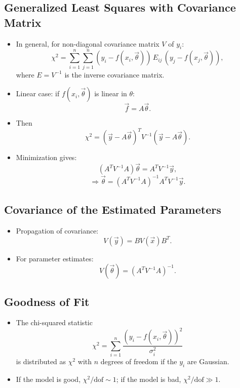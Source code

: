 \subsection{Generalized Least Squares with Covariance Matrix}
\begin{itemize}
    \item In general, for non-diagonal covariance matrix $V$ of $y_i$:
          \[
              \chi^2 = \sum_{i=1}^{n} \sum_{j=1}^{n}
              (y_i - f(x_i, \vec{\theta})) \, E_{ij} \, (y_j - f(x_j, \vec{\theta})),
          \]
          where $E = V^{-1}$ is the inverse covariance matrix.
    \item Linear case: if $f(x_i, \vec{\theta})$ is linear in $\theta$:
          \[
              \vec{f} = A \vec{\theta}.
          \]
    \item Then
          \[
              \chi^2 = (\vec{y} - A \vec{\theta})^T V^{-1} (\vec{y} - A \vec{\theta}).
          \]
    \item Minimization gives:
          \[
              (A^T V^{-1} A) \vec{\theta} = A^T V^{-1} \vec{y},
          \]
          \[
              \Rightarrow \vec{\theta} = (A^T V^{-1} A)^{-1} A^T V^{-1} \vec{y}.
          \]
\end{itemize}

\subsection{Covariance of the Estimated Parameters}
\begin{itemize}
    \item Propagation of covariance:
          \[
              V(\vec{y}) = B V(\vec{x}) B^T.
          \]
    \item For parameter estimates:
          \[
              V(\vec{\theta}) = (A^T V^{-1} A)^{-1}.
          \]
\end{itemize}

\subsection{Goodness of Fit}
\begin{itemize}
    \item The chi-squared statistic
          \[
              \chi^2 = \sum_{i=1}^{n} \frac{(y_i - f(x_i, \vec{\theta}))^2}{\sigma_i^2}
          \]
          is distributed as $\chi^2$ with $n$ degrees of freedom if the $y_i$ are Gaussian.
    \item If the model is good, $\chi^2/\text{dof} \sim 1$; if the model is bad, $\chi^2/\text{dof} \gg 1$.
\end{itemize}
